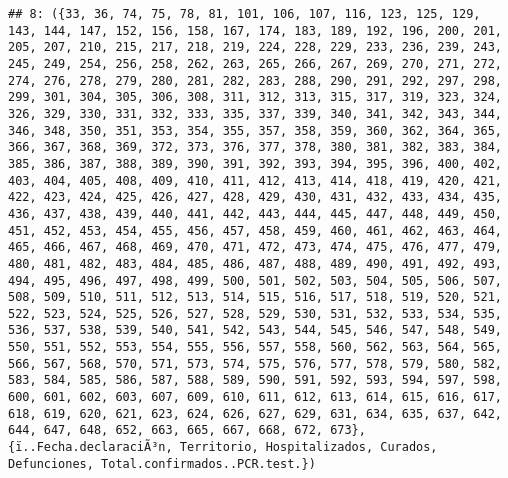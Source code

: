 \documentclass[
]{book}
\begin{document}
\begin{verbatim}
## 8: ({33, 36, 74, 75, 78, 81, 101, 106, 107, 116, 123, 125, 129, 143, 144, 147, 152, 156, 158, 167, 174, 183, 189, 192, 196, 200, 201, 205, 207, 210, 215, 217, 218, 219, 224, 228, 229, 233, 236, 239, 243, 245, 249, 254, 256, 258, 262, 263, 265, 266, 267, 269, 270, 271, 272, 274, 276, 278, 279, 280, 281, 282, 283, 288, 290, 291, 292, 297, 298, 299, 301, 304, 305, 306, 308, 311, 312, 313, 315, 317, 319, 323, 324, 326, 329, 330, 331, 332, 333, 335, 337, 339, 340, 341, 342, 343, 344, 346, 348, 350, 351, 353, 354, 355, 357, 358, 359, 360, 362, 364, 365, 366, 367, 368, 369, 372, 373, 376, 377, 378, 380, 381, 382, 383, 384, 385, 386, 387, 388, 389, 390, 391, 392, 393, 394, 395, 396, 400, 402, 403, 404, 405, 408, 409, 410, 411, 412, 413, 414, 418, 419, 420, 421, 422, 423, 424, 425, 426, 427, 428, 429, 430, 431, 432, 433, 434, 435, 436, 437, 438, 439, 440, 441, 442, 443, 444, 445, 447, 448, 449, 450, 451, 452, 453, 454, 455, 456, 457, 458, 459, 460, 461, 462, 463, 464, 465, 466, 467, 468, 469, 470, 471, 472, 473, 474, 475, 476, 477, 479, 480, 481, 482, 483, 484, 485, 486, 487, 488, 489, 490, 491, 492, 493, 494, 495, 496, 497, 498, 499, 500, 501, 502, 503, 504, 505, 506, 507, 508, 509, 510, 511, 512, 513, 514, 515, 516, 517, 518, 519, 520, 521, 522, 523, 524, 525, 526, 527, 528, 529, 530, 531, 532, 533, 534, 535, 536, 537, 538, 539, 540, 541, 542, 543, 544, 545, 546, 547, 548, 549, 550, 551, 552, 553, 554, 555, 556, 557, 558, 560, 562, 563, 564, 565, 566, 567, 568, 570, 571, 573, 574, 575, 576, 577, 578, 579, 580, 582, 583, 584, 585, 586, 587, 588, 589, 590, 591, 592, 593, 594, 597, 598, 600, 601, 602, 603, 607, 609, 610, 611, 612, 613, 614, 615, 616, 617, 618, 619, 620, 621, 623, 624, 626, 627, 629, 631, 634, 635, 637, 642, 644, 647, 648, 652, 663, 665, 667, 668, 672, 673}, {ï..Fecha.declaraciÃ³n, Territorio, Hospitalizados, Curados, Defunciones, Total.confirmados..PCR.test.})

\end{verbatim}
\end{document}
